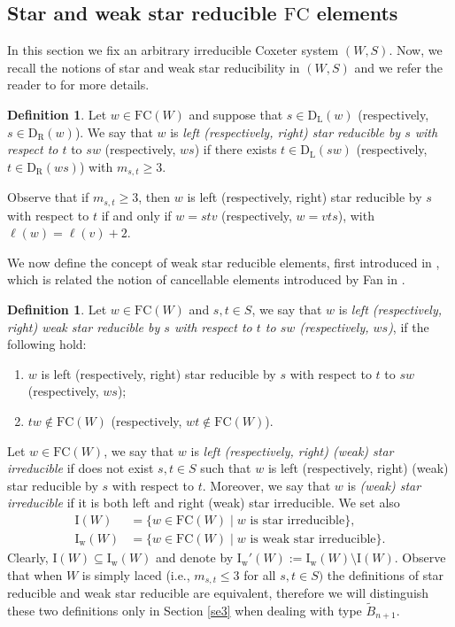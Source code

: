 \documentclass{amsart}
\newcommand{\B}{{\widetilde{B}_{n+1}}}
\newcommand{\ld}{{\mathrm{D}_{\mathrm{L}}}}
\newcommand{\rd}{{\mathrm{D}_{\mathrm{R}}}}
\newcommand{\fc}{{\mathrm{FC}}}
\newcommand{\IR}{\mathrm{I_w}}
\newcommand{\IRc}{\mathrm{I_w'}}
\newcommand{\I}{\mathrm{I}}
\theoremstyle{definition}
\newtheorem{Definition}[Theorem]{Definition}
\begin{document}
\subsection{Star and weak star reducible $\fc$ elements}

In this section we fix an arbitrary irreducible Coxeter system $(W,S)$.
Now, we recall the notions of star and weak star reducibility in $(W,S)$ and we refer the reader to \cite{ernst, GreenStar, green-trace} for more details. 
\begin{Definition}
\label{def:star-red}
    Let $w\in \fc(W)$ and suppose that $s\in \ld(w)$ (respectively, $s\in \rd(w)$). We say that $w$ is \emph{left (respectively, right) star reducible by $s$ with respect to $t$} to $sw$ (respectively, $ws$) if there exists $t\in \ld(sw)$ (respectively, $t\in \rd(ws)$) with $m_{s,t}\ge 3$. 
\end{Definition}

Observe that if $m_{s,t}\ge 3$, then $w$ is left (respectively, right) star reducible by $s$ with respect to $t$ if and only if $w=stv$ (respectively, $w=vts$), with $\ell(w)=\ell(v)+2$.

We now define the concept of weak star reducible elements, first introduced in \cite{ernst}, which is related the notion of cancellable elements introduced by Fan in \cite{Fan}. 

\begin{Definition}
\label{irr}
Let $w \in \fc(W)$ and $s,t\in S$, we say that $w$ is \textit{left (respectively, right) weak star reducible by $s$ with respect to $t$ to $sw$ (respectively, $ws$)}, if the following hold:
\begin{enumerate}
    \item[(a)] $w$ is left (respectively, right) star reducible by $s$ with respect to $t$ to $sw$ (respectively, $ws$);
    \item[(b)] $tw\notin \fc(W)$ (respectively,  $wt\notin \fc(W)$). 
\end{enumerate}

\end{Definition}

Let $w\in \fc(W)$, we say that $w$ is \emph{left (respectively, right) (weak) star irreducible} if does not exist $s,t\in S$ such that $w$ is left (respectively, right) (weak) star reducible by $s$ with respect to $t$. Moreover, we say that $w$ is \emph{(weak) star irreducible} if it is both left and right (weak) star irreducible. We set also 
\begin{align*}
    \I(W)&=\{w\in \fc(W) \mid w \mbox{ is star irreducible}\}, \\
    \IR(W)&=\{w\in \fc(W) \mid w \mbox{ is weak star irreducible}\}.
\end{align*}
Clearly, $\I(W)\subseteq \IR(W)$ and denote by $\IRc(W):=\IR(W)\setminus\I(W)$. Observe that when $W$ is simply laced (i.e., $m_{s,t}\leq 3$ for all $s,t\in S)$ the definitions of star reducible and weak star reducible are equivalent, therefore we will distinguish these two definitions only in Section \ref{se3} when dealing with type $\B$.  
\smallskip
\end{document}
